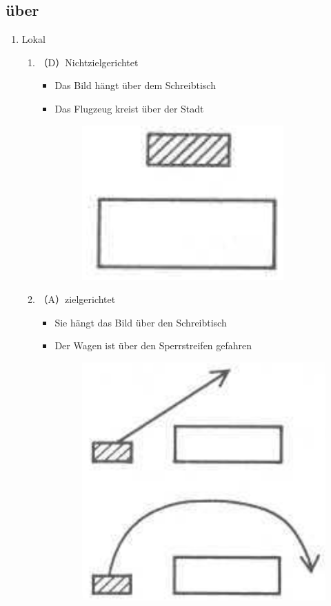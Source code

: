 \documentclass[UTF8]{report}
\begin{document}
\subsection{über}
\begin{enumerate}
    \item Lokal
    \begin{enumerate}
        \item （D）Nichtzielgerichtet
        \begin{itemize}
            \item Das Bild hängt über dem Schreibtisch
            \item Das Flugzeug kreist über der Stadt
            \begin{figure}[H]
                \centering
                \includegraphics[scale=0.3]{uber1.png}
            \end{figure}
        \end{itemize}
        \item （A）zielgerichtet
        \begin{itemize}
            \item Sie hängt das Bild über den Schreibtisch
            \item Der Wagen ist über den Sperrstreifen gefahren
            \begin{figure}[H]
                \centering
                \includegraphics[scale=0.3]{uber2.png}

\end{figure}
\end{itemize}
\end{enumerate}
\end{enumerate}
\end{document}
